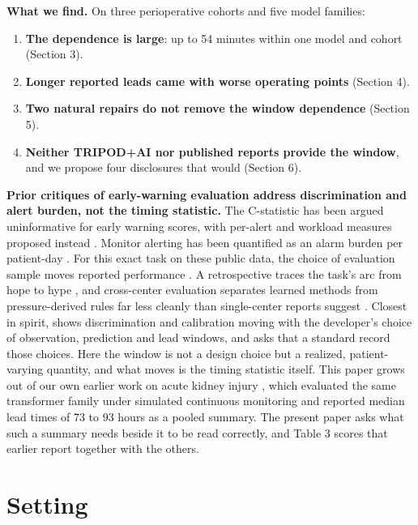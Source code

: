 \textbf{What we find.} On three perioperative cohorts and five model families:

\begin{enumerate}
\def\labelenumi{\arabic{enumi}.}
\tightlist
\item
  \textbf{The dependence is large}: up to 54 minutes within one model and cohort (Section 3).
\item
  \textbf{Longer reported leads came with worse operating points} (Section 4).
\item
  \textbf{Two natural repairs do not remove the window dependence} (Section 5).
\item
  \textbf{Neither TRIPOD+AI nor published reports provide the window}, and we propose four
  disclosures that would (Section 6).
\end{enumerate}

\textbf{Prior critiques of early-warning evaluation address discrimination and alert burden, not the
timing statistic.} The C-statistic has been argued uninformative for early warning scores, with
per-alert and workload measures proposed instead \citep{romerobrufau2015cstatistic}. Monitor alerting
has been quantified as an
alarm burden per patient-day \citep{paine2016alerts}. For this exact task on these public data, the
choice of evaluation sample moves reported performance \citep{yang2025selection}. A retrospective
traces the task's arc from hope to hype \citep{michard2023hype}, and cross-center evaluation separates
learned methods from pressure-derived rules far less cleanly than single-center reports suggest
\citep{chaari2026crosscenter}. Closest in spirit, \citet{lauritsen2021framing} shows discrimination and
calibration moving with the developer's choice of observation, prediction and lead windows, and
asks that a standard record those choices. Here the window is not a design choice but a
realized, patient-varying quantity, and what moves is the timing statistic itself.
This paper grows out of our own earlier work on acute kidney injury \citep{lee2026aki}, which evaluated
the same transformer family under simulated continuous monitoring and reported median lead times
of 73 to 93 hours as a pooled summary. The present paper asks what such a summary needs beside it
to be read correctly, and Table 3 scores that earlier report together with the others.

\section{Setting}\label{setting}

